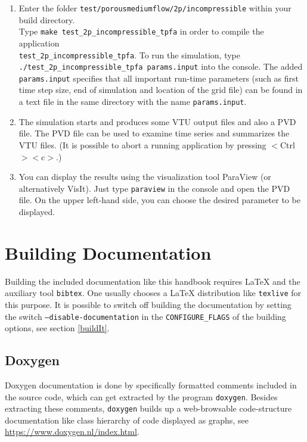 \begin{enumerate}
\item Enter the folder \texttt{test/porousmediumflow/2p/incompressible} within your build directory.\\ Type \texttt{make test{\_}2p{\_}incompressible{\_}tpfa}
      in order to compile the application\\\texttt{test{\_}2p{\_}incompressible{\_}tpfa}. To run the simulation,
      type \texttt{./test{\_}2p{\_}incompressible{\_}tpfa params.input}
      into the console.
      The added \texttt{params.input} specifies that all
      important run-time parameters (such as first time step size, end of simulation and location
      of the grid file) can be found in a text file in the same directory  with the
      name \texttt{params.input}.
\item The simulation starts and produces some VTU output files and also a PVD
      file. The PVD file can be used to examine time series and summarizes the VTU
      files. (It is possible to abort a running application by pressing $<$Ctrl$><$c$>$.)
\item You can display the results using the visualization tool ParaView (or
      alternatively VisIt). Just type \texttt{paraview} in the console and open the
      PVD file. On the upper left-hand side, you can choose the desired parameter to be displayed.
\end{enumerate}

\section{Building Documentation}
\label{sec:build-doc}
Building the included documentation like this handbook requires \LaTeX{} and the auxiliary tool
\texttt{bibtex}. One usually chooses a \LaTeX{} distribution like \texttt{texlive} for this purpose.
It is possible to switch off building the documentation by setting the switch \texttt{--disable-documentation}
in the \texttt{CONFIGURE\_FLAGS} of the building options, see section \ref{buildIt}.

\subsection{Doxygen}
\label{sec:build-doxy-doc}
Doxygen documentation is done by specifically formatted comments included in the source code,
which can get extracted by the program \texttt{doxygen}. Besides extracting these comments,
\texttt{doxygen} builds up a web-browsable code-structure documentation
like class hierarchy of code displayed as graphs, see \url{https://www.doxygen.nl/index.html}.

